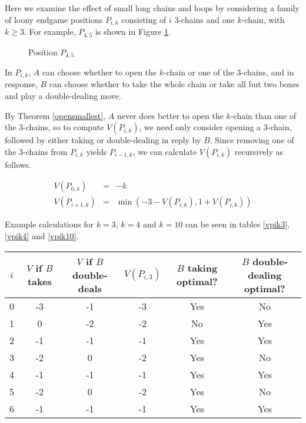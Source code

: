 \documentclass[a4paper,twocolumn]{article}
\begin{document}
Here we examine the effect of small long chains and loops by
considering a family of loony endgame positions $P_{i,k}$ consisting
of $i$ 3-chains and one $k$-chain, with $k \ge 3$. For example,
$P_{4,5}$ is shown in Figure \ref{p45}.

\begin{figure}
  \centering
  \def\svgscale{0.7}
  
  \caption{Position $P_{4,5}$}
  \label{p45}
\end{figure}

In $P_{i,k}$, $A$ can choose whether to open the $k$-chain or one of
the 3-chains, and in response, $B$ can choose whether to take the
whole chain or take all but two boxes and play a double-dealing move.

By Theorem \ref{opensmallest}, $A$ never does better to open the
$k$-chain than one of the 3-chains, so to compute $V(P_{i,k})$, we
need only consider opening a 3-chain, followed by either taking or
double-dealing in reply by $B$. Since removing one of the 3-chains
from $P_{i,k}$ yields $P_{i-1,k}$, we can calculate $V(P_{i,k})$
recursively as follows.

\begin{eqnarray*}
  V(P_{0,k}) & = & -k \\
  V(P_{i+1,k}) & = & \min(-3-V(P_{i,k}), 1+V(P_{i,k}))
\end{eqnarray*}

Example calculations for $k=3$, $k=4$ and $k=10$ can be seen in tables
\ref{vpik3}, \ref{vpik4} and \ref{vpik10}.

\begin{table*}[p]
  \centering
  \begin{tabular}{c c c c c c}
    $i$ & $V$ if $B$ takes & $V$ if $B$ double-deals & $V(P_{i,3})$ & $B$ taking optimal? & $B$ double-dealing optimal? \\
    \hline
    0 & -3 & -1 & -3 & Yes & No \\
    1 & 0 & -2 & -2 & No & Yes \\
    2 & -1 & -1 & -1 & Yes & Yes \\
    3 & -2 & 0 & -2 & Yes & No \\
    4 & -1 & -1 & -1 & Yes & Yes \\
    5 & -2 & 0 & -2 & Yes & No \\
    6 & -1 & -1 & -1 & Yes & Yes
  \end{tabular}
  \caption{$k=3$}
  \label{vpik3}
\end{table*}
\end{document}
